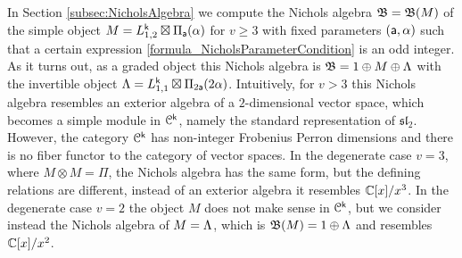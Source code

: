 \documentclass[a4paper, reqno]{amsart}
\theoremstyle{introTheorems}
\newcommand\cC{\mathcal{C}}
\renewcommand\sl{\mathfrak{sl}}
\renewcommand{\1}{\mathbbold{1}}
\begin{document}
In Section \ref{subsec:NicholsAlgebra} we compute the Nichols algebra $\mathfrak{B}=\mathfrak{B}(M)$ of the simple object $M=L^{\mathsf{k}}_{1,2}\boxtimes \Pi_{\mathsf{a}}(\alpha)$ for $v\geq 3$ with fixed parameters $(\mathsf{a},\alpha)$ such that a certain expression \eqref{formula_NicholsParameterCondition} is an odd integer. As it turns out, as a graded object this Nichols algebra is $\mathfrak{B}=1\oplus M\oplus \Lambda$ with the invertible object $\Lambda=L^{\mathsf{k}}_{1,1}\boxtimes \Pi_{2\mathsf{a}}(2\alpha)$. Intuitively, for $v>3$ this Nichols algebra resembles  an exterior algebra of a $2$-dimensional vector space, which becomes a simple module in $\cC^\k$, namely the standard representation of $\sl_2$. However, the category $\cC^\k$ has non-integer Frobenius Perron dimensions and there is no fiber functor to the category of vector spaces. In the degenerate case $v=3$, where $M\otimes M=\Pi$, the Nichols algebra has the same form, but the defining relations are different, instead of an exterior algebra it resembles $\mathbb{C}[x]/x^3$. In the degenerate case $v=2$ the object $M$ does not make sense in $\cC^\k$, but we consider instead the Nichols algebra of $M=\Lambda$, which is $\mathfrak{B}(M)=1\oplus \Lambda$ and resembles $\mathbb{C}[x]/x^2$.
\end{document}
